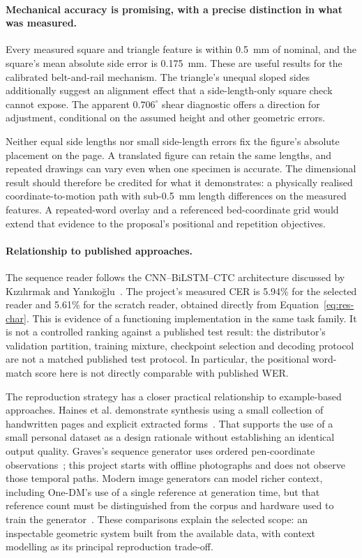 \paragraph{Mechanical accuracy is promising, with a precise distinction in what was measured.}
Every measured square and triangle feature is within 0.5~mm of nominal, and the square's mean absolute side error is 0.175~mm. These are useful results for the calibrated belt-and-rail mechanism. The triangle's unequal sloped sides additionally suggest an alignment effect that a side-length-only square check cannot expose. The apparent $0.706^\circ$ shear diagnostic offers a direction for adjustment, conditional on the assumed height and other geometric errors.

Neither equal side lengths nor small side-length errors fix the figure's absolute placement on the page. A translated figure can retain the same lengths, and repeated drawings can vary even when one specimen is accurate. The dimensional result should therefore be credited for what it demonstrates: a physically realised coordinate-to-motion path with sub-0.5~mm length differences on the measured features. A repeated-word overlay and a referenced bed-coordinate grid would extend that evidence to the proposal's positional and repetition objectives.

\paragraph{Relationship to published approaches.}
The sequence reader follows the CNN--BiLSTM--CTC architecture discussed by K{\i}z{\i}l{\i}rmak and Yan{\i}ko{\u g}lu~\cite[pp.~4--5]{kizilirmak2023}. The project's measured CER is 5.94\% for the selected reader and 5.61\% for the scratch reader, obtained directly from Equation~\ref{eq:res-char}. This is evidence of a functioning implementation in the same task family. It is not a controlled ranking against a published test result: the distributor's validation partition, training mixture, checkpoint selection and decoding protocol are not a matched published test protocol. In particular, the positional word-match score here is not directly comparable with published WER.

The reproduction strategy has a closer practical relationship to example-based approaches. Haines et al. demonstrate synthesis using a small collection of handwritten pages and explicit extracted forms~\cite[p.~4]{haines2016}. That supports the use of a small personal dataset as a design rationale without establishing an identical output quality. Graves's sequence generator uses ordered pen-coordinate observations~\cite[p.~18]{graves2013}; this project starts with offline photographs and does not observe those temporal paths. Modern image generators can model richer context, including One-DM's use of a single reference at generation time, but that reference count must be distinguished from the corpus and hardware used to train the generator~\cite[p.~9]{dai2024}. These comparisons explain the selected scope: an inspectable geometric system built from the available data, with context modelling as its principal reproduction trade-off.

